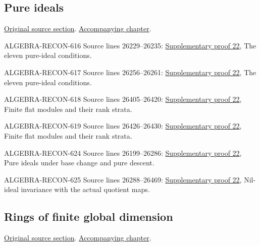 \subsection{Pure ideals}
\hypertarget{algebra-source-section-pure-ideals}{}
\noindent\href{https://github.com/stacks/stacks-project/blob/a04446e57ec1fbc252a871afcec7752fb2807b14/algebra.tex\#L26192}{Original source section}. \href{algebra.pdf\#nameddest=section-pure-ideals}{Accompanying chapter}.

\begin{AlgebraSourceRoutes}
\item[ALGEBRA-RECON-616] Source lines 26229--26235: \hyperlink{algebra_pure_global_notes_20260928}{Supplementary proof 22}, The eleven pure-ideal conditions.
\item[ALGEBRA-RECON-617] Source lines 26256--26261: \hyperlink{algebra_pure_global_notes_20260928}{Supplementary proof 22}, The eleven pure-ideal conditions.
\item[ALGEBRA-RECON-618] Source lines 26405--26420: \hyperlink{algebra_pure_global_notes_20260928}{Supplementary proof 22}, Finite flat modules and their rank strata.
\item[ALGEBRA-RECON-619] Source lines 26426--26430: \hyperlink{algebra_pure_global_notes_20260928}{Supplementary proof 22}, Finite flat modules and their rank strata.
\item[ALGEBRA-RECON-624] Source lines 26199--26286: \hyperlink{algebra_pure_global_notes_20260928}{Supplementary proof 22}, Pure ideals under base change and pure descent.
\item[ALGEBRA-RECON-625] Source lines 26288--26469: \hyperlink{algebra_pure_global_notes_20260928}{Supplementary proof 22}, Nil-ideal invariance with the actual quotient maps.
\end{AlgebraSourceRoutes}

\subsection{Rings of finite global dimension}
\hypertarget{algebra-source-section-ring-finite-gl-dim}{}
\noindent\href{https://github.com/stacks/stacks-project/blob/a04446e57ec1fbc252a871afcec7752fb2807b14/algebra.tex\#L26477}{Original source section}. \href{algebra.pdf\#nameddest=section-ring-finite-gl-dim}{Accompanying chapter}.

